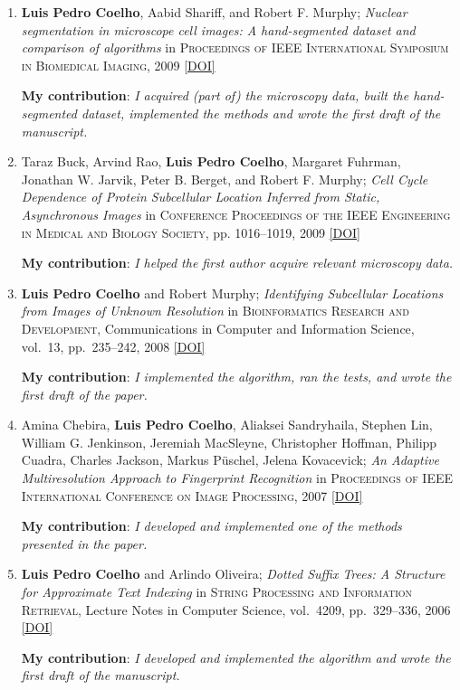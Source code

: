 \documentclass{article}
\newcommand\showdoi[1]{%
    \href{http://dx.doi.org/#1}{[DOI]}%
}
\newcommand\pubname[1]{\textsc{#1}}
\newcommand\contribution[1]{\relax\hfill\break\textbf{My contribution}: \textit{#1}}
\begin{document}
\begin{enumerate}[resume]
\item \textbf{Luis Pedro Coelho}, Aabid Shariff, and Robert F. Murphy;
\emph{Nuclear segmentation in microscope cell images: A hand-segmented dataset
and comparison of algorithms} in \pubname{Proceedings of IEEE International
Symposium in Biomedical Imaging}, 2009 \showdoi{10.1109/ISBI.2009.5193098}
\contribution{I acquired (part of) the microscopy data, built the
hand-segmented dataset, implemented the methods and wrote the first draft of
the manuscript.}

\item Taraz Buck, Arvind Rao, \textbf{Luis Pedro Coelho}, Margaret Fuhrman,
Jonathan W. Jarvik, Peter B. Berget, and Robert F. Murphy; \emph{Cell Cycle
Dependence of Protein Subcellular Location Inferred from Static, Asynchronous
Images} in \pubname{Conference Proceedings of the IEEE Engineering in Medical
and Biology Society}, pp. 1016--1019, 2009 \showdoi{10.1109/IEMBS.2009.5332888}
\contribution{I helped the first author acquire relevant microscopy data.}

\item \textbf{Luis Pedro Coelho} and Robert Murphy; \emph{Identifying
Subcellular Locations from Images of Unknown Resolution} in
\pubname{Bioinformatics Research and Development}, Communications in Computer
and Information Science, vol.\ 13, pp.\ 235--242, 2008
\showdoi{10.1007/978-3-540-70600-7_18}
\contribution{I implemented the algorithm, ran the tests, and wrote the first
draft of the paper.}

\item Amina Chebira, \textbf{Luis Pedro Coelho}, Aliaksei Sandryhaila, Stephen
Lin, William G. Jenkinson, Jeremiah MacSleyne, Christopher Hoffman, Philipp
Cuadra, Charles Jackson, Markus Püschel, Jelena Kovacevick; \emph{An Adaptive
Multiresolution Approach to Fingerprint Recognition} in \pubname{Proceedings of
IEEE International Conference on Image Processing}, 2007
\showdoi{10.1109/ICIP.2007.4378990}
\contribution{I developed and implemented one of the methods presented in the
paper.}

\item \textbf{Luis Pedro Coelho} and Arlindo Oliveira; \emph{Dotted Suffix
Trees: A Structure for Approximate Text Indexing} in \pubname{String Processing
and Information Retrieval}, Lecture Notes in Computer Science, vol.\ 4209, pp.\
329--336, 2006 \showdoi{10.1007/11880561_27}
\contribution{I developed and implemented the algorithm and wrote the first
draft of the manuscript.}

\end{enumerate}
\end{document}
